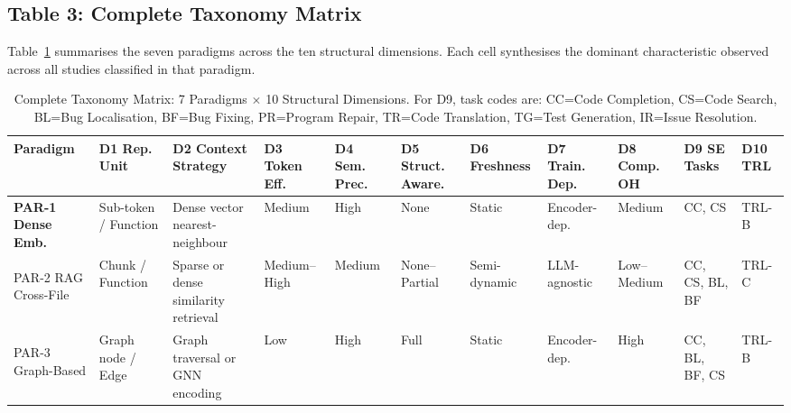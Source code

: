 \documentclass[acmsmall,screen,review]{acmart}
\begin{document}
\subsection{Table 3: Complete Taxonomy Matrix}
\label{subsec:matrix}

Table~\ref{tab:taxonomy_matrix} summarises the seven paradigms across
the ten structural dimensions. Each cell synthesises the dominant
characteristic observed across all studies classified in that paradigm.

\begin{table}
\caption{Complete Taxonomy Matrix: 7 Paradigms $\times$ 10 Structural
  Dimensions. For D9, task codes are: CC=Code Completion, CS=Code
  Search, BL=Bug Localisation, BF=Bug Fixing, PR=Program Repair,
  TR=Code Translation, TG=Test Generation, IR=Issue Resolution.}
\label{tab:taxonomy_matrix}
\renewcommand{\arraystretch}{1.35}
\small
\begin{tabular}{>{\bfseries}p{2.2cm}
                p{2.0cm}   %
                p{2.2cm}   %
                p{1.5cm}   %
                p{1.5cm}   %
                p{1.8cm}   %
                p{2.0cm}   %
                p{2.0cm}   %
                p{1.8cm}   %
                p{2.4cm}   %
                p{1.2cm}}  %
\toprule
\textbf{Paradigm} &
  \textbf{D1 Rep. Unit} &
  \textbf{D2 Context Strategy} &
  \textbf{D3 Token Eff.} &
  \textbf{D4 Sem. Prec.} &
  \textbf{D5 Struct. Aware.} &
  \textbf{D6 Freshness} &
  \textbf{D7 Train. Dep.} &
  \textbf{D8 Comp. OH} &
  \textbf{D9 SE Tasks} &
  \textbf{D10 TRL} \\
\midrule

PAR-1 \newline Dense Emb. &
  Sub-token / Function &
  Dense vector nearest-neighbour &
  Medium &
  High &
  None &
  Static &
  Encoder-dep. &
  Medium &
  CC, CS &
  TRL-B \\

\midrule

PAR-2 \newline RAG Cross-File &
  Chunk / Function &
  Sparse or dense similarity retrieval &
  Medium–High &
  Medium &
  None–Partial &
  Semi-dynamic &
  LLM-agnostic &
  Low–Medium &
  CC, CS, BL, BF &
  TRL-C \\

\midrule

PAR-3 \newline Graph-Based &
  Graph node / Edge &
  Graph traversal or GNN encoding &
  Low &
  High &
  Full &
  Static &
  Encoder-dep. &
  High &
  CC, BL, BF, CS &
  TRL-B \\


\end{tabular}
\end{table}
\end{document}
